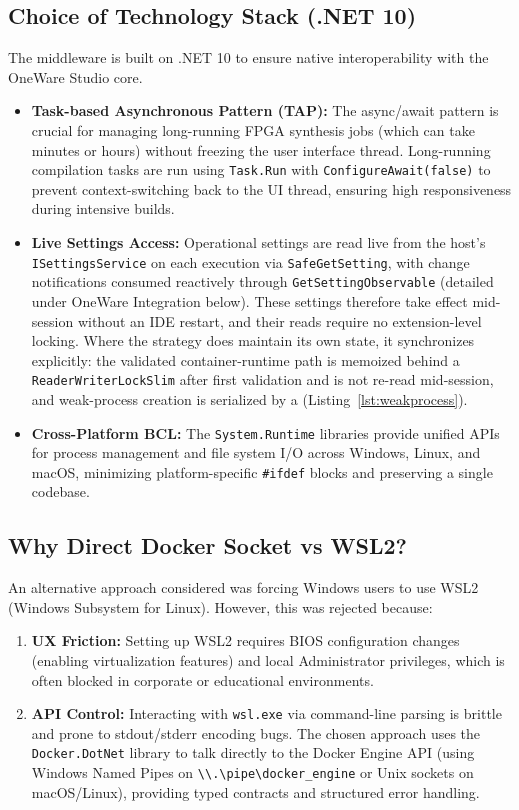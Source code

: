 \subsection{Choice of Technology Stack (.NET 10)}
The middleware is built on .NET 10 to ensure native interoperability with the OneWare Studio core.
\begin{itemize}
    \item \textbf{Task-based Asynchronous Pattern (TAP):} The async/await pattern is crucial for managing long-running FPGA synthesis jobs (which can take minutes or hours) without freezing the user interface thread. Long-running compilation tasks are run using \texttt{Task.Run} with \texttt{ConfigureAwait(false)} to prevent context-switching back to the UI thread, ensuring high responsiveness during intensive builds.
    \item \textbf{Live Settings Access:} Operational settings are read live from the host's \texttt{ISettingsService} on each execution via \texttt{SafeGetSetting}, with change notifications consumed reactively through \texttt{GetSettingObservable} (detailed under OneWare Integration below). These settings therefore take effect mid-session without an IDE restart, and their reads require no extension-level locking. Where the strategy does maintain its own state, it synchronizes explicitly: the validated container-runtime path is memoized behind a \texttt{ReaderWriter\-Lock\-Slim} after first validation and is not re-read mid-session, and weak-process creation is serialized by a  (Listing~\ref{lst:weakprocess}).
    \item \textbf{Cross-Platform BCL:} The \texttt{System.Runtime} libraries provide unified APIs for process management and file system I/O across Windows, Linux, and macOS, minimizing platform-specific \texttt{\#ifdef} blocks and preserving a single codebase.
\end{itemize}

\subsection{Why Direct Docker Socket vs WSL2?}
An alternative approach considered was forcing Windows users to use WSL2 (Windows Subsystem for Linux). However, this was rejected because:
\begin{enumerate}
    \item \textbf{UX Friction:} Setting up WSL2 requires BIOS configuration changes (enabling virtualization features) and local Administrator privileges, which is often blocked in corporate or educational environments.
    \item \textbf{API Control:} Interacting with \texttt{wsl.exe} via command-line parsing is brittle and prone to stdout/stderr encoding bugs. The chosen approach uses the \texttt{Docker.DotNet} library to talk directly to the Docker Engine API (using Windows Named Pipes on \texttt{\textbackslash\textbackslash.\textbackslash pipe\textbackslash docker\_engine} or Unix sockets on macOS/Linux), providing typed contracts and structured error handling.
\end{enumerate}

